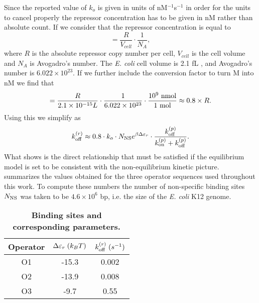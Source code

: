 Since the reported value of $k_o$ is given in units of nM$^{-1}$s$^{-1}$ in
order for the units to cancel properly the repressor concentration has to be
given in nM rather than absolute count. If we consider that the repressor
concentration is equal to
\begin{equation}
[R] = \frac{R}{V_{cell}}\cdot \frac{1}{N_A},
\end{equation}
where $R$ is the absolute repressor copy number per cell, $V_{cell}$ is the cell
volume and $N_A$ is Avogadro's number. The \textit{E. coli} cell volume is 2.1
fL \cite{Radzikowski2016}, and Avogadro's number is $6.022 \times 10^{23}$. If
we further include the conversion factor to turn M into nM we find that
\begin{equation}
[R] = {R \over 2.1 \times 10^{-15} L} \cdot {1 \over 6.022 \times 10^{23}}
\cdot {10^9 \text{ nmol} \over 1 \text{ mol}} \approx 0.8 \times R.
\end{equation}
Using this we simplify  as
\begin{equation}
  k^{(r)}_{\text{off}} \approx 0.8 \cdot k_o \cdot N_\text{NS} e^{\beta\Delta\varepsilon_r}
   \cdot {k^{(p)}_{\text{off}}\over k^{(p)}_{\text{on}}+ k^{(p)}_{\text{off}}}.
  \label{seq_kroff}
\end{equation}
What  shows is the direct relationship that must be satisfied if
the equilibrium model is set to be consistent with the non-equilibrium kinetic
picture.  summarizes the values obtained for the three operator
sequences used throughout this work. To compute these numbers the number of
non-specific binding sites $N_\text{NS}$ was taken to be $4.6 \times 10^6$ bp, i.e. the
size of the {\it E. coli} K12 genome.

\begin{table}[]
  \caption{\textbf{Binding sites and corresponding parameters.}}
\begin{tabular}{|c|c|c|}
\hline
 Operator & $\Delta\varepsilon_r\; (k_BT)$ & $k^{(r)}_{\text{off}} \; (s^{-1})$  \\ \hline
 O1 & -15.3 & 0.002  \\ \hline
 O2 & -13.9 & 0.008  \\ \hline
 O3 & -9.7  & 0.55   \\ \hline
\end{tabular}
\label{stab_koff}
\end{table}

